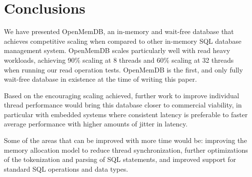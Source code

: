 \documentclass[conference, compsoc]{IEEEtran}
\begin{document}
\section{Conclusions}
We have presented OpenMemDB, an in-memory and wait-free database that achieves competitive scaling when compared to other
in-memory SQL database management system.  OpenMemDB scales particularly well with read heavy workloads, achieving 90\% 
scaling at 8 threads and 60\% scaling at 32 threads when running our read operation tests. OpenMemDB is the first, and only fully
wait-free database in existence at the time of writing this paper. 
\par\vspace{\baselineskip}
Based on the encouraging scaling achieved, further work to improve individual thread performance would bring this database
closer to commercial viability, in particular with embedded systems where consistent latency is preferable to faster average
performance with higher amounts of jitter in latency.
\par\vspace{\baselineskip}
Some of the areas that can be improved with more time would be: improving the memory allocation model to reduce thread
synchronization, further optimizations of the tokenization and parsing of SQL statements, and improved support for standard
SQL operations and data types.

\newpage


\newpage
\end{document}
